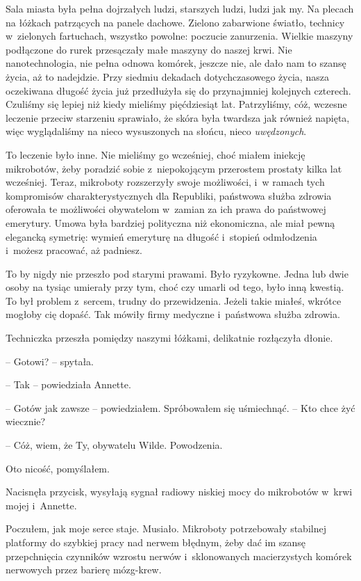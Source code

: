 \documentclass[oneside,polish,11pt,sfheadings]{mwbk}
\begin{document}
Sala miasta była pełna dojrzałych ludzi, starszych ludzi, ludzi jak my.
Na plecach na łóżkach patrzących na panele dachowe. Zielono zabarwione
światło, technicy w~zielonych fartuchach, wszystko powolne: poczucie
zanurzenia. Wielkie maszyny podłączone do rurek przesączały małe maszyny
do naszej krwi. Nie nanotechnologia, nie pełna odnowa komórek, jeszcze
nie, ale dało nam to szansę życia, aż to nadejdzie. Przy siedmiu
dekadach dotychczasowego życia, nasza oczekiwana długość życia już
przedłużyła się do przynajmniej kolejnych czterech. Czuliśmy się lepiej
niż kiedy mieliśmy pięćdziesiąt lat. Patrzyliśmy, cóż, wczesne leczenie
przeciw starzeniu sprawiało, że skóra była twardsza jak również napięta,
więc wyglądaliśmy na nieco wysuszonych na słońcu, nieco \emph{uwędzonych}.

To leczenie było inne. Nie mieliśmy go wcześniej, choć miałem iniekcję
mikrobotów, żeby poradzić sobie z~niepokojącym przerostem prostaty kilka
lat wcześniej. Teraz, mikroboty rozszerzyły swoje możliwości, i~w ramach
tych kompromisów charakterystycznych dla Republiki, państwowa służba
zdrowia oferowała te możliwości obywatelom w~zamian za ich prawa do
państwowej emerytury. Umowa była bardziej polityczna niż ekonomiczna,
ale miał pewną elegancką symetrię: wymień emeryturę na długość i~stopień
odmłodzenia i~możesz pracować, aż padniesz.

To by nigdy nie przeszło pod starymi prawami. Było ryzykowne. Jedna lub
dwie osoby na tysiąc umierały przy tym, choć czy umarli od tego, było
inną kwestią. To był problem z~sercem, trudny do przewidzenia. Jeżeli
takie miałeś, wkrótce mogłoby cię dopaść. Tak mówiły firmy medyczne i~państwowa służba zdrowia.

Techniczka przeszła pomiędzy naszymi łóżkami, delikatnie rozłączyła
dłonie.

-- Gotowi? -- spytała.

-- Tak -- powiedziała Annette.

-- Gotów jak zawsze -- powiedziałem. Spróbowałem się uśmiechnąć. -- Kto
chce żyć wiecznie?

-- Cóż, wiem, że Ty, obywatelu Wilde. Powodzenia.

Oto nicość, pomyślałem.

Nacisnęła przycisk, wysyłają sygnał radiowy niskiej mocy do mikrobotów w~krwi mojej i~Annette.

Poczułem, jak moje serce staje. Musiało. Mikroboty potrzebowały
stabilnej platformy do szybkiej pracy nad nerwem błędnym, żeby dać im
szansę przepchnięcia czynników wzrostu nerwów i~sklonowanych
macierzystych komórek nerwowych przez barierę mózg-krew.
\end{document}
